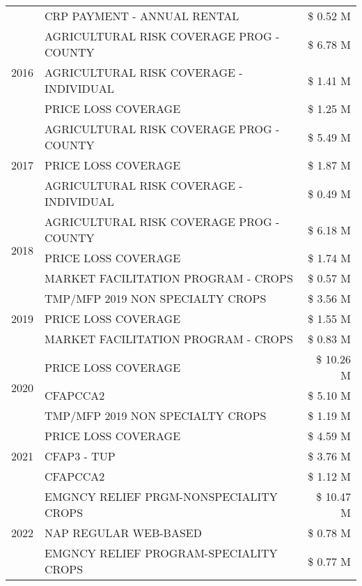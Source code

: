\begin{tabular}{llr}
 & CRP PAYMENT - ANNUAL RENTAL & \$ 0.52 M \\
\cline{1-3}
\multirow[t]{3}{*}{2016} & AGRICULTURAL RISK COVERAGE PROG - COUNTY & \$ 6.78 M \\
 & AGRICULTURAL RISK COVERAGE - INDIVIDUAL & \$ 1.41 M \\
 & PRICE LOSS COVERAGE & \$ 1.25 M \\
\cline{1-3}
\multirow[t]{3}{*}{2017} & AGRICULTURAL RISK COVERAGE PROG - COUNTY & \$ 5.49 M \\
 & PRICE LOSS COVERAGE & \$ 1.87 M \\
 & AGRICULTURAL RISK COVERAGE - INDIVIDUAL & \$ 0.49 M \\
\cline{1-3}
\multirow[t]{3}{*}{2018} & AGRICULTURAL RISK COVERAGE PROG - COUNTY & \$ 6.18 M \\
 & PRICE LOSS COVERAGE & \$ 1.74 M \\
 & MARKET FACILITATION PROGRAM - CROPS & \$ 0.57 M \\
\cline{1-3}
\multirow[t]{3}{*}{2019} & TMP/MFP 2019 NON SPECIALTY CROPS & \$ 3.56 M \\
 & PRICE LOSS COVERAGE & \$ 1.55 M \\
 & MARKET FACILITATION PROGRAM - CROPS & \$ 0.83 M \\
\cline{1-3}
\multirow[t]{3}{*}{2020} & PRICE LOSS COVERAGE & \$ 10.26 M \\
 & CFAPCCA2 & \$ 5.10 M \\
 & TMP/MFP 2019 NON SPECIALTY CROPS & \$ 1.19 M \\
\cline{1-3}
\multirow[t]{3}{*}{2021} & PRICE LOSS COVERAGE & \$ 4.59 M \\
 & CFAP3 - TUP & \$ 3.76 M \\
 & CFAPCCA2 & \$ 1.12 M \\
\cline{1-3}
\multirow[t]{3}{*}{2022} & EMGNCY RELIEF PRGM-NONSPECIALITY CROPS & \$ 10.47 M \\
 & NAP REGULAR WEB-BASED & \$ 0.78 M \\
 & EMGNCY RELIEF PROGRAM-SPECIALITY CROPS & \$ 0.77 M \\
\cline{1-3}
\bottomrule
\end{tabular}
